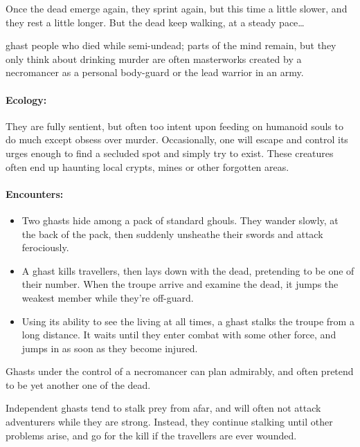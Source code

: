\begin{multicols}{2}
Once the dead emerge again, they sprint again, but this time a little slower, and they rest a little longer.
But the dead keep walking, at a steady pace\ldots

  {ghast}%
  {people who died while semi-undead; parts of the mind remain, but they only think about drinking murder}%
are often masterworks created by a necromancer as a personal body-guard or the lead warrior in an army.


\paragraph{Ecology:} They are fully sentient, but often too intent upon feeding on humanoid souls to do much except obsess over murder.
Occasionally, one will escape and control its urges enough to find a secluded spot and simply try to exist.
These creatures often end up haunting local crypts, mines or other forgotten areas.

\paragraph{Encounters:}

\begin{itemize}

  \item
  Two ghasts hide among a pack of standard ghouls.
  They wander slowly, at the back of the pack, then suddenly unsheathe their swords and attack ferociously.
  \item
  A ghast kills travellers, then lays down with the dead, pretending to be one of their number.
  When the troupe arrive and examine the dead, it jumps the weakest member while they're off-guard.
  \item
  Using its ability to see the living at all times, a ghast stalks the troupe from a long distance.
  It waits until they enter combat with some other force, and jumps in as soon as they become injured.

\end{itemize}

Ghasts under the control of a necromancer can plan admirably, and often pretend to be yet another one of the dead.

Independent ghasts tend to stalk prey from afar, and will often not attack adventurers while they are strong.
Instead, they continue stalking until other problems arise, and go for the kill if the travellers are ever wounded.


\end{multicols}
